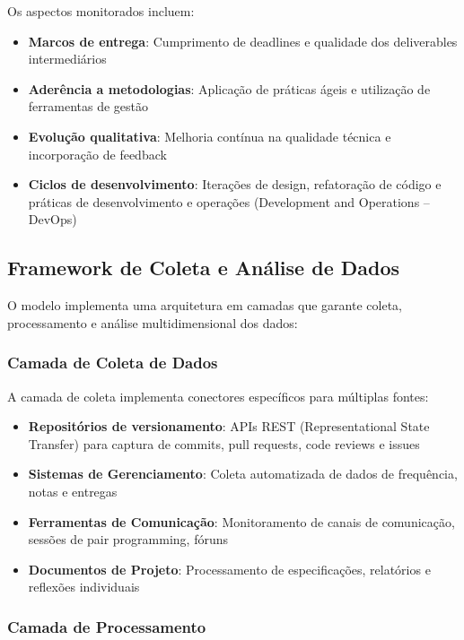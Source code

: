 \documentclass[english, spanish, brazilian]{modelo_dt}
\begin{document}
Os aspectos monitorados incluem:
\begin{itemize}
  \item \textbf{Marcos de entrega}: Cumprimento de deadlines e qualidade dos deliverables intermediários
  \item \textbf{Aderência a metodologias}: Aplicação de práticas ágeis e utilização de ferramentas de gestão
  \item \textbf{Evolução qualitativa}: Melhoria contínua na qualidade técnica e incorporação de feedback
  \item \textbf{Ciclos de desenvolvimento}: Iterações de design, refatoração de código e práticas de desenvolvimento e operações (Development and Operations -- DevOps)
\end{itemize}

\subsection{Framework de Coleta e Análise de Dados}

O modelo implementa uma arquitetura em camadas que garante coleta,
processamento e análise multidimensional dos dados:

\subsubsection{Camada de Coleta de Dados}

A camada de coleta implementa conectores específicos para múltiplas fontes:
\begin{itemize}
  \item \textbf{Repositórios de versionamento}: APIs REST (Representational State Transfer) para captura de commits, pull requests, code reviews e issues
  \item \textbf{Sistemas de Gerenciamento}: Coleta automatizada de dados de frequência, notas e entregas
  \item \textbf{Ferramentas de Comunicação}: Monitoramento de canais de comunicação, sessões de pair programming, fóruns
  \item \textbf{Documentos de Projeto}: Processamento de especificações, relatórios e reflexões individuais
\end{itemize}

\subsubsection{Camada de Processamento}
\end{document}
